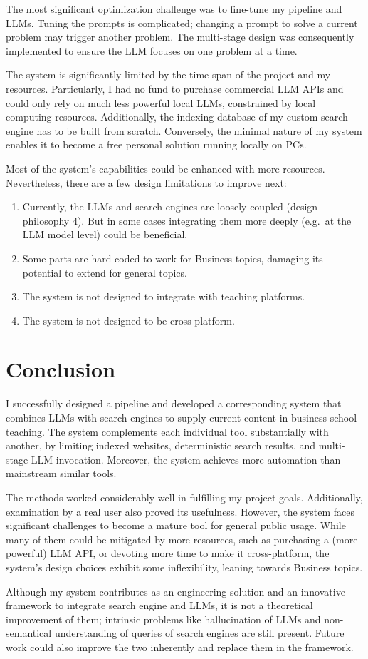 \documentclass[final-report]{report-template}
\begin{document}
The most significant optimization challenge was to fine-tune my pipeline and
LLMs. Tuning the prompts is complicated; changing a prompt to solve a current
problem may trigger another problem. The multi-stage design was consequently
implemented to ensure the LLM focuses on one problem at a time.

The system is significantly limited by the time-span of the project and my
resources. Particularly, I had no fund to purchase commercial LLM APIs and
could only rely on much less powerful local LLMs, constrained by local
computing resources. Additionally, the indexing database of my custom search
engine has to be built from scratch. Conversely, the minimal nature of my
system enables it to become a free personal solution running locally on PCs.

Most of the system's capabilities could be enhanced with more resources.
Nevertheless, there are a few design limitations to improve next: 
\begin{enumerate}
	\item Currently, the LLMs and search engines are loosely coupled (design
		philosophy 4). But in some cases integrating them more deeply (e.g.\ at
		the LLM model level) could be beneficial.
	\item Some parts are hard-coded to work for Business topics, damaging its
		potential to extend for general topics.
	\item The system is not designed to integrate with teaching platforms.
	\item The system is not designed to be cross-platform.
\end{enumerate}

\section{Conclusion}
I successfully designed a pipeline and developed a corresponding system
that combines LLMs with search engines to supply current content in business
school teaching. The system complements each individual tool substantially with
another, by limiting indexed websites, deterministic search results, and
multi-stage LLM invocation. Moreover, the system achieves more automation than
mainstream similar tools.

The methods worked considerably well in fulfilling my project goals.
Additionally, examination by a real user also proved its usefulness. However,
the system faces significant challenges to become a mature tool for general
public usage. While many of them could be mitigated by more resources, such as
purchasing a (more powerful) LLM API, or devoting more time to make it
cross-platform, the system's design choices exhibit some inflexibility, leaning
towards Business topics.

Although my system contributes as an engineering solution and an innovative
framework to integrate search engine and LLMs, it is not a theoretical
improvement of them; intrinsic problems like hallucination of LLMs and
non-semantical understanding of queries of search engines are still present.
Future work could also improve the two inherently and replace them in the
framework.

\clearpage

 

\end{document}
